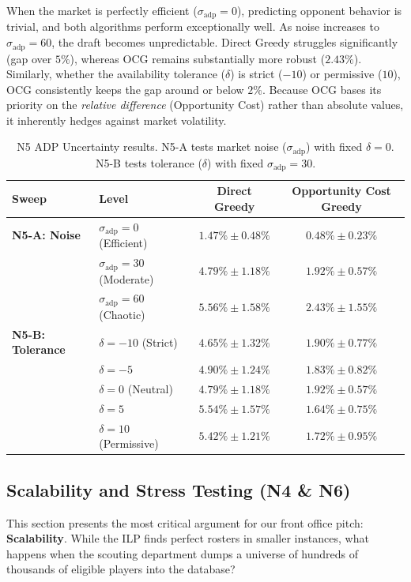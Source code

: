 \documentclass[11pt,a4paper]{article}
\begin{document}
When the market is perfectly efficient ($\sigma_{\text{adp}}=0$), predicting opponent behavior is trivial, and both algorithms perform exceptionally well. As noise increases to $\sigma_{\text{adp}}=60$, the draft becomes unpredictable. Direct Greedy struggles significantly (gap over $5\%$), whereas OCG remains substantially more robust ($2.43\%$). Similarly, whether the availability tolerance ($\delta$) is strict ($-10$) or permissive ($10$), OCG consistently keeps the gap around or below $2\%$. Because OCG bases its priority on the \textit{relative difference} (Opportunity Cost) rather than absolute values, it inherently hedges against market volatility.

\begin{table}[H]
\centering
\caption{N5 ADP Uncertainty results. N5-A tests market noise ($\sigma_{\text{adp}}$) with fixed $\delta=0$. N5-B tests tolerance ($\delta$) with fixed $\sigma_{\text{adp}}=30$.}
\label{tab:n5}
\begin{tabular}{llcc}
\toprule
Sweep & Level & Direct Greedy & Opportunity Cost Greedy \\
\midrule
\textbf{N5-A: Noise} & $\sigma_{\text{adp}}=0$ (Efficient) & $1.47\% \pm 0.48\%$ & $\mathbf{0.48\% \pm 0.23\%}$ \\
 & $\sigma_{\text{adp}}=30$ (Moderate) & $4.79\% \pm 1.18\%$ & $1.92\% \pm 0.57\%$ \\
 & $\sigma_{\text{adp}}=60$ (Chaotic) & $5.56\% \pm 1.58\%$ & $2.43\% \pm 1.55\%$ \\
\midrule
\textbf{N5-B: Tolerance} & $\delta=-10$ (Strict) & $4.65\% \pm 1.32\%$ & $1.90\% \pm 0.77\%$ \\
 & $\delta=-5$ & $4.90\% \pm 1.24\%$ & $1.83\% \pm 0.82\%$ \\
 & $\delta=0$ (Neutral) & $4.79\% \pm 1.18\%$ & $1.92\% \pm 0.57\%$ \\
 & $\delta=5$ & $5.54\% \pm 1.57\%$ & $\mathbf{1.64\% \pm 0.75\%}$ \\
 & $\delta=10$ (Permissive) & $5.42\% \pm 1.21\%$ & $1.72\% \pm 0.95\%$ \\
\bottomrule
\end{tabular}
\end{table}

\subsection{Scalability and Stress Testing (N4 \& N6)}

This section presents the most critical argument for our front office pitch: \textbf{Scalability}. While the ILP finds perfect rosters in smaller instances, what happens when the scouting department dumps a universe of hundreds of thousands of eligible players into the database?
\end{document}
